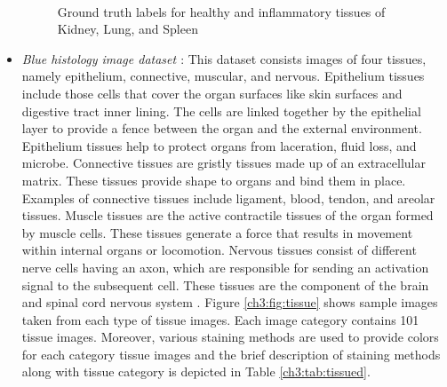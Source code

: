 \begin{itemize}
\begin{figure}[h]
        \\
        \hspace{2mm}
  \caption[Healthy and inflammatory tissues of Kidney, Lung, and Spleen]{\fontsize{10}{12}\selectfont Ground truth labels for healthy and inflammatory tissues of Kidney, Lung, and Spleen \cite{srinivas2014}}
\label{ch3:fig:ADLdataset}
\end{figure}


\item \emph{Blue histology image dataset \cite{BlueHist:online}}: This dataset consists images of four tissues, namely epithelium, connective, muscular, and nervous. Epithelium tissues include those cells that cover the organ surfaces like skin surfaces and digestive tract inner lining. The cells are linked together by the epithelial layer to provide a fence between the organ and the external environment. Epithelium tissues help to protect organs from laceration, fluid loss, and microbe. Connective tissues are gristly tissues made up of an extracellular matrix. These tissues provide shape to organs and bind them in place. Examples of connective tissues include ligament, blood, tendon, and areolar tissues. Muscle tissues are the active contractile tissues of the organ formed by muscle cells. These tissues generate a force that results in movement within internal organs or locomotion. Nervous tissues consist of different nerve cells having an axon, which are responsible for sending an activation signal to the subsequent cell. These tissues are the component of the brain and spinal cord nervous system \cite{eurell2013}.  Figure \ref{ch3:fig:tissue} shows sample images taken from each type of tissue images. Each image category contains 101 tissue images. Moreover, various staining methods are used to provide colors for each category tissue images and the brief description of staining methods along with tissue category is depicted in Table \ref{ch3:tab:tissued}.


\end{itemize}
